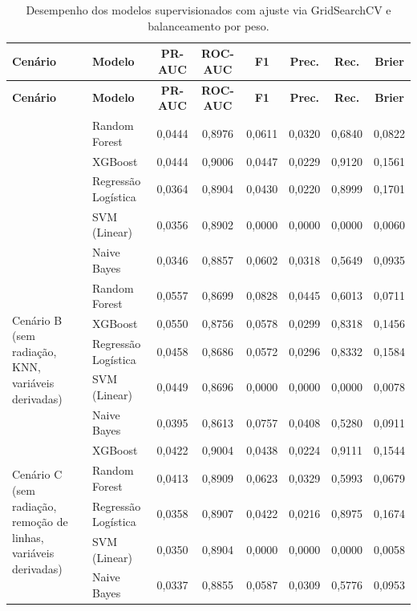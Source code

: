 \begin{longtable}{p{3.4cm} l c c c c c c}
\caption{Desempenho dos modelos supervisionados com ajuste via GridSearchCV e balanceamento por peso.}
\label{tab:resultados_grid_pesos_calculadas} \\
\toprule
\textbf{Cenário} & \textbf{Modelo} & \textbf{PR-AUC} & \textbf{ROC-AUC} & \textbf{F1} & \textbf{Prec.} & \textbf{Rec.} & \textbf{Brier} \\
\midrule
\endfirsthead

\toprule
\textbf{Cenário} & \textbf{Modelo} & \textbf{PR-AUC} & \textbf{ROC-AUC} & \textbf{F1} & \textbf{Prec.} & \textbf{Rec.} & \textbf{Brier} \\
\midrule
\endhead

\bottomrule
\endfoot

\bottomrule
\endlastfoot

\multirow{5}{*}{\parbox{3.4cm}{\centering Cenário A\\(sem radiação, variáveis derivadas)}} 
   & Random Forest       & 0,0444 & 0,8976 & 0,0611 & 0,0320 & 0,6840 & 0,0822 \\
   & XGBoost             & 0,0444 & 0,9006 & 0,0447 & 0,0229 & 0,9120 & 0,1561 \\
   & Regressão Logística & 0,0364 & 0,8904 & 0,0430 & 0,0220 & 0,8999 & 0,1701 \\
   & SVM (Linear)        & 0,0356 & 0,8902 & 0,0000 & 0,0000 & 0,0000 & 0,0060 \\
   & Naive Bayes         & 0,0346 & 0,8857 & 0,0602 & 0,0318 & 0,5649 & 0,0935 \\
\midrule

\multirow{5}{*}{\parbox{3.4cm}{\centering Cenário B\\(sem radiação, KNN, variáveis derivadas)}} 
   & Random Forest       & 0,0557 & 0,8699 & 0,0828 & 0,0445 & 0,6013 & 0,0711 \\
   & XGBoost             & 0,0550 & 0,8756 & 0,0578 & 0,0299 & 0,8318 & 0,1456 \\
   & Regressão Logística & 0,0458 & 0,8686 & 0,0572 & 0,0296 & 0,8332 & 0,1584 \\
   & SVM (Linear)        & 0,0449 & 0,8696 & 0,0000 & 0,0000 & 0,0000 & 0,0078 \\
   & Naive Bayes         & 0,0395 & 0,8613 & 0,0757 & 0,0408 & 0,5280 & 0,0911 \\
\midrule

\multirow{5}{*}{\parbox{3.4cm}{\centering Cenário C\\(sem radiação, remoção de linhas, variáveis derivadas)}} 
   & XGBoost             & 0,0422 & 0,9004 & 0,0438 & 0,0224 & 0,9111 & 0,1544 \\
   & Random Forest       & 0,0413 & 0,8909 & 0,0623 & 0,0329 & 0,5993 & 0,0679 \\
   & Regressão Logística & 0,0358 & 0,8907 & 0,0422 & 0,0216 & 0,8975 & 0,1674 \\
   & SVM (Linear)        & 0,0350 & 0,8904 & 0,0000 & 0,0000 & 0,0000 & 0,0058 \\
   & Naive Bayes         & 0,0337 & 0,8855 & 0,0587 & 0,0309 & 0,5776 & 0,0953 \\
\midrule


\end{longtable}
